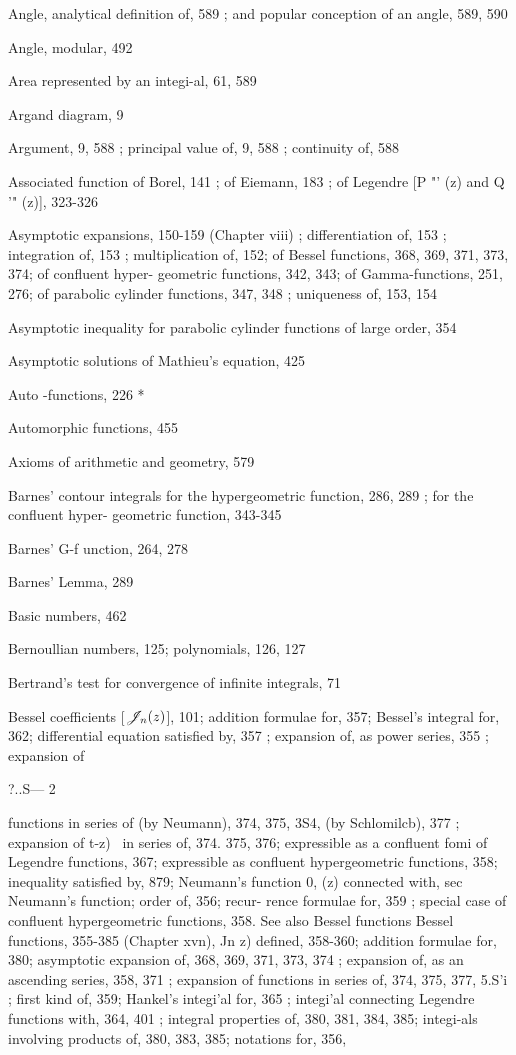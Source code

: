 Angle, analytical definition of, 589 ; and popular conception of an angle, 589, 590

Angle, modular, 492

Area represented by an integi-al, 61, 589

Argand diagram, 9

Argument, 9, 588 ; principal value of, 9, 588 ; continuity of, 588

Associated function of Borel, 141 ; of Eiemann, 183 ; of Legendre [P "' (z) and Q '" (z)], 323-326

Asymptotic expansions, 150-159 (Chapter viii) ; differentiation of, 153 ; integration of, 153 ;
multiplication of, 152; of Bessel functions, 368, 369, 371, 373, 374; of confluent hyper-
geometric functions, 342, 343; of Gamma-functions, 251, 276; of parabolic cylinder functions,
347, 348 ; uniqueness of, 153, 154

Asymptotic inequality for parabolic cylinder functions of large order, 354

Asymptotic solutions of Mathieu's equation, 425

Auto -functions, 226 *

Automorphic functions, 455

Axioms of arithmetic and geometry, 579

Barnes' contour integrals for the hypergeometric function, 286, 289 ; for the confluent hyper-
geometric function, 343-345

Barnes' G-f unction, 264, 278

Barnes' Lemma, 289

Basic numbers, 462

Bernoullian numbers, 125; polynomials, 126, 127

Bertrand's test for convergence of infinite integrals, 71

Bessel coefficients [$\mathscr{J}_{n}(z)$], 101; addition formulae for, 357; Bessel's integral for, 362;
differential equation satisfied by, 357 ; expansion of, as power series, 355 ; expansion of

?..S— 2

%
%
functions in series of (by Neumann), 374, 375, 3S4, (by Schlomilcb), 377 ; expansion of
 t-z)~  in series of, 374. 375, 376; expressible as a confluent fomi of Legendre functions,
367; expressible as confluent hypergeometric functions, 358; inequality satisfied by, 879;
Neumann's function 0, (z) connected with, sec Neumann's function; order of, 356; recur-
rence formulae for, 359 ; special case of confluent hypergeometric functions, 358. See also
Bessel functions
Bessel functions, 355-385 (Chapter xvn), Jn z) defined, 358-360; addition formulae for, 380;
asymptotic expansion of, 368, 369, 371, 373, 374 ; expansion of, as an ascending series, 358,
371 ; expansion of functions in series of, 374, 375, 377, 5.S'i ; first kind of, 359; Hankel's
integi'al for, 365 ; integi'al connecting Legendre functions with, 364, 401 ; integral properties
of, 380, 381, 384, 385; integi-als involving products of, 380, 383, 385; notations for, 356,

